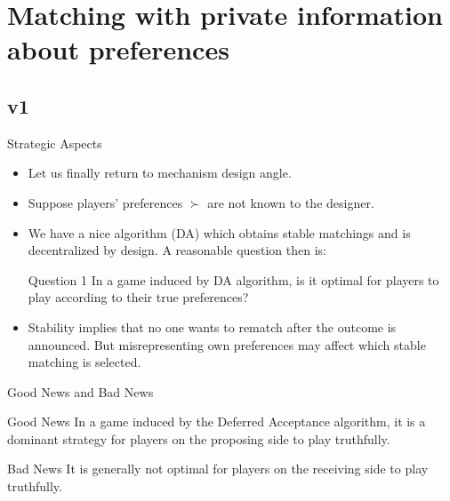 \documentclass[english,10pt
,aspectratio=169
]{beamer}
\begin{document}
\section{Matching with private information about preferences}

\subsection{v1}

\begin{frame}{Strategic Aspects}
\begin{itemize}
	\item Let us finally return to mechanism design angle.
	\item Suppose players' preferences $\succ$ are not known to the designer.
	\item We have a nice algorithm (DA) which obtains stable matchings and is decentralized by design. A reasonable question then is:
	\begin{block}{Question 1}
		In a game induced by DA algorithm, is it optimal for players to play according to their true preferences?
	\end{block}
	\item Stability implies that no one wants to rematch after the outcome is announced. But misrepresenting own preferences may affect which stable matching is selected.
\end{itemize}
\end{frame}


\begin{frame}{Good News and Bad News}
\begin{exampleblock}{Good News}
	In a game induced by the Deferred Acceptance algorithm, it is a dominant strategy for players on the proposing side to play truthfully.
\end{exampleblock}

\begin{alertblock}{Bad News}
	It is generally not optimal for players on the receiving side to play truthfully.
\end{alertblock}
\end{frame}
\end{document}
